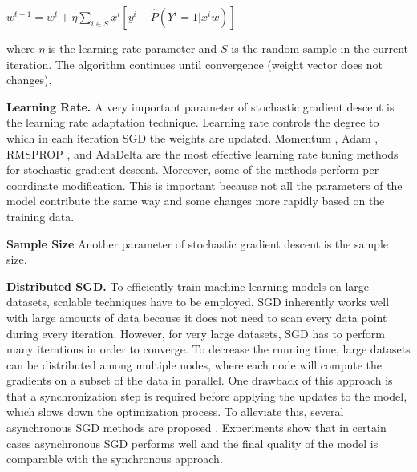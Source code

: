 ${w}^{t+1} = {w}^t + \eta \sum_{i \in S} x^i [y^i - \hat{P}(Y^i = 1 | x^i w)]$

where $\eta$ is the learning rate parameter and $S$ is the random sample in the current iteration.
The algorithm continues until convergence (weight vector does not changes).

\textbf{Learning Rate. }
A very important parameter of stochastic gradient descent is the learning rate adaptation technique. 
Learning rate controls the degree to which in each iteration SGD the weights are updated.
Momentum \cite{qian1999momentum}, Adam \cite{kingma2014adam}, RMSPROP \cite{tieleman2012lecture}, and AdaDelta \cite{zeiler2012adaptive} are the most effective learning rate tuning methods for stochastic gradient descent. 
Moreover, some of the methods perform per coordinate modification. 
This is important because not all the parameters of the model contribute the same way and some changes more rapidly based on the training data.

\textbf{Sample Size}
Another parameter of stochastic gradient descent is the sample size.

\textbf{Distributed SGD. }
To efficiently train machine learning models on large datasets, scalable techniques have to be employed.
SGD inherently works well with large amounts of data because it does not need to scan every data point during every iteration.
However, for very large datasets, SGD has to perform many iterations in order to converge.
To decrease the running time, large datasets can be distributed among multiple nodes, where each node will compute the gradients on a subset of the data in parallel.
One drawback of this approach is that a synchronization step is required before applying the updates to the model, which slows down the optimization process.
To alleviate this, several asynchronous SGD methods are proposed \cite{recht2011hogwild, dean2012large}. 
Experiments show that in certain cases asynchronous SGD performs well and the final quality of the model is comparable with the synchronous approach.


